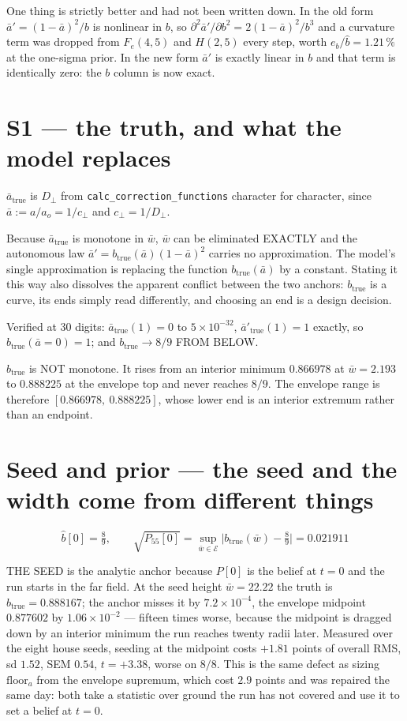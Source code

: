 \documentclass[11pt,a4paper,fontset=none]{ctexart}
\newcommand{\ba}{\bar{a}}
\newcommand{\bw}{\bar{w}}
\begin{document}
One thing is strictly better and had not been written down. In the old form
$\ba' = (1-\ba)^{2}/b$ is nonlinear in $b$, so
$\partial^{2}\ba'/\partial b^{2} = 2(1-\ba)^{2}/b^{3}$ and a curvature term was
dropped from $F_e(4,5)$ and $H(2,5)$ every step, worth $e_b/\hat{b} = 1.21\,\%$
at the one-sigma prior. In the new form $\ba'$ is exactly linear in $b$ and that
term is identically zero: the $b$ column is now exact.

\section*{S1 --- the truth, and what the model replaces}

$\ba_{\mathrm{true}}$ is $D_{\perp}$ from \texttt{calc\_correction\_functions}
character for character, since $\ba := a/a_o = 1/c_{\perp}$ and
$c_{\perp} = 1/D_{\perp}$.

Because $\ba_{\mathrm{true}}$ is monotone in $\bw$, $\bw$ can be eliminated
EXACTLY and the autonomous law $\ba' = b_{\mathrm{true}}(\ba)(1-\ba)^{2}$ carries
no approximation. The model's single approximation is replacing the function
$b_{\mathrm{true}}(\ba)$ by a constant. Stating it this way also dissolves the
apparent conflict between the two anchors: $b_{\mathrm{true}}$ is a curve, its
ends simply read differently, and choosing an end is a design decision.

Verified at 30 digits: $\ba_{\mathrm{true}}(1) = 0$ to $5\times10^{-32}$,
$\ba'_{\mathrm{true}}(1) = 1$ exactly, so $b_{\mathrm{true}}(\ba = 0) = 1$; and
$b_{\mathrm{true}} \to 8/9$ FROM BELOW.

$b_{\mathrm{true}}$ is NOT monotone. It rises from an interior minimum
$0.866978$ at $\bw = 2.193$ to $0.888225$ at the envelope top and never reaches
$8/9$. The envelope range is therefore $[0.866978,\ 0.888225]$, whose lower end
is an interior extremum rather than an endpoint.

\section*{Seed and prior --- the seed and the width come from different things}

\begin{equation*}
\hat{b}[0] = \tfrac{8}{9},
\qquad
\sqrt{P_{55}[0]} = \sup_{\bw\in\mathcal{E}}
  \bigl|b_{\mathrm{true}}(\bw) - \tfrac{8}{9}\bigr| = 0.021911
\end{equation*}

THE SEED is the analytic anchor because $P[0]$ is the belief at $t=0$ and the
run starts in the far field. At the seed height $\bw = 22.22$ the truth is
$b_{\mathrm{true}} = 0.888167$; the anchor misses it by $7.2\times10^{-4}$, the
envelope midpoint $0.877602$ by $1.06\times10^{-2}$ --- fifteen times worse,
because the midpoint is dragged down by an interior minimum the run reaches
twenty radii later. Measured over the eight house seeds, seeding at the midpoint
costs $+1.81$ points of overall RMS, sd $1.52$, SEM $0.54$, $t = +3.38$, worse
on $8/8$. This is the same defect as sizing $\mathrm{floor}_a$ from the envelope
supremum, which cost $2.9$ points and was repaired the same day: both take a
statistic over ground the run has not covered and use it to set a belief at
$t=0$.
\end{document}
